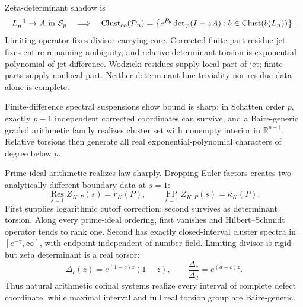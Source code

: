 \documentclass[11pt]{article}
\theoremstyle{definition}
\theoremstyle{remark}
\newcommand{\R}{\mathbb R}
\newcommand{\Res}{\operatorname*{Res}}
\newcommand{\FP}{\operatorname*{FP}}
\begin{document}
Zeta-determinant shadow is
\[
 L_n^{-1}\to A\text{ in }\mathcal S_p
 \quad\Longrightarrow\quad
 \operatorname{Clust}_{\rm co}(\mathcal D_n)
 =\left\{e^{P_b}\det{}_p(I-zA):
 b\in\operatorname{Clust}(b(L_n))\right\}.
\]
Limiting operator fixes divisor-carrying core.  Corrected finite-part residue jet fixes entire
remaining ambiguity, and relative determinant torsion is exponential polynomial of jet
difference.  Wodzicki residues supply local part of jet; finite parts supply nonlocal part.
Neither determinant-line triviality nor residue data alone is complete.

Finite-difference spectral suspensions show bound is sharp: in Schatten order $p$, exactly
$p-1$ independent corrected coordinates can survive, and a Baire-generic graded arithmetic
family realizes cluster set with nonempty interior in $\R^{p-1}$.  Relative torsions then generate
all real exponential-polynomial characters of degree below $p$.

Prime-ideal arithmetic realizes law sharply.  Dropping Euler factors creates two analytically
different boundary data at $s=1$:
\[
 \Res_{s=1}Z_{K,P}(s)=r_K(P),\qquad
 \FP_{s=1}Z_{K,P}(s)=\kappa_K(P).
\]
First supplies logarithmic cutoff correction; second survives as determinant torsion.  Along
every prime-ideal ordering, first vanishes and Hilbert--Schmidt operator tends to rank one.
Second has exactly closed-interval cluster spectra in $[e^{-\gamma},\infty]$, with endpoint
independent of number field.  Limiting divisor is rigid but zeta determinant is a real torsor:
\[
 \Delta_c(z)=e^{(1-c)z}(1-z),\qquad
 \frac{\Delta_c}{\Delta_d}=e^{(d-c)z}.
\]
Thus natural arithmetic cofinal systems realize every interval of complete defect coordinate,
while maximal interval and full real torsion group are Baire-generic.
\end{document}
